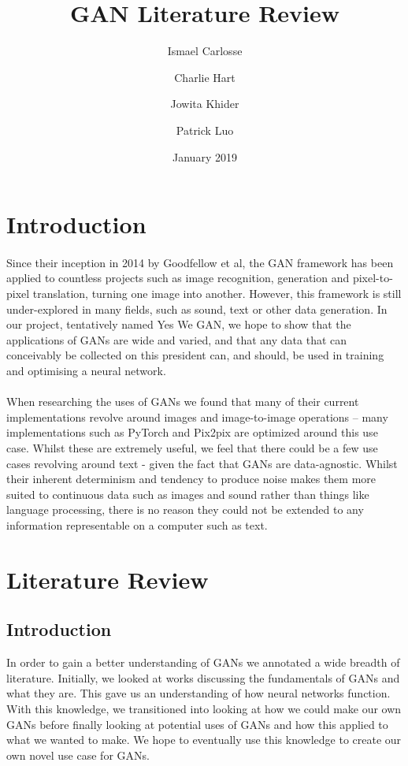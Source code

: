 \documentclass{article}
\title{GAN Literature Review}
\author{Ismael Carlosse \and Charlie Hart \and Jowita Khider \and Patrick Luo}
\date{January 2019}
\begin{document}
\maketitle

\section{Introduction}
\paragraph{}
Since their inception in 2014 by Goodfellow et al, the GAN framework has been applied to countless projects such as image recognition, generation and pixel-to-pixel translation, turning one image into another. However, this framework is still under-explored in many fields, such as sound, text or other data generation. In our project, tentatively named Yes We GAN, we hope to show that the applications of GANs are wide and varied, and that any data that can conceivably be collected on this president can, and should, be used in training and optimising a neural network. 
\paragraph{}
When researching the uses of GANs we found that many of their current implementations revolve around images and image-to-image operations – many implementations such as PyTorch and Pix2pix are optimized around this use case. Whilst these are extremely useful, we feel that there could be a few use cases revolving around text - given the fact that GANs are data-agnostic. Whilst their inherent determinism and tendency to produce noise makes them more suited to continuous data such as images and sound rather than things like language processing, there is no reason they could not be extended to any information representable on a computer such as text.

\section{Literature Review}
\subsection{Introduction}
In order to gain a better understanding of GANs we annotated a wide breadth of literature. Initially, we looked at works discussing the fundamentals of GANs and what they are. This gave us an understanding of how neural networks function. With this knowledge, we transitioned into looking at how we could make our own GANs before finally looking at potential uses of GANs and how this applied to what we wanted to make. We hope to eventually use this knowledge to create our own novel use case for GANs.
\end{document}
